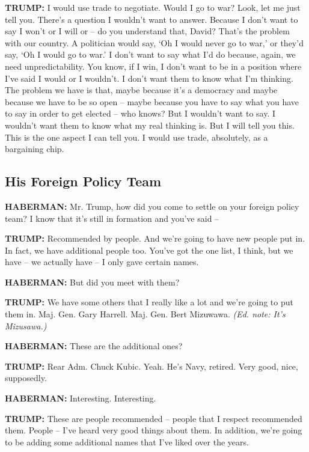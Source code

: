 \textbf{TRUMP:} I would use trade to negotiate. Would I go to war? Look,
let me just tell you. There's a question I wouldn't want to answer.
Because I don't want to say I won't or I will or -- do you understand
that, David? That's the problem with our country. A politician would
say, `Oh I would never go to war,' or they'd say, `Oh I would go to
war.' I don't want to say what I'd do because, again, we need
unpredictability. You know, if I win, I don't want to be in a position
where I've said I would or I wouldn't. I don't want them to know what
I'm thinking. The problem we have is that, maybe because it's a
democracy and maybe because we have to be so open -- maybe because you
have to say what you have to say in order to get elected -- who knows?
But I wouldn't want to say. I wouldn't want them to know what my real
thinking is. But I will tell you this. This is the one aspect I can tell
you. I would use trade, absolutely, as a bargaining chip.

\hypertarget{his-foreign-policy-team}{%
\subsection{His Foreign Policy Team}\label{his-foreign-policy-team}}

\textbf{HABERMAN:} Mr. Trump, how did you come to settle on your foreign
policy team? I know that it's still in formation and you've said --

\textbf{TRUMP:} Recommended by people. And we're going to have new
people put in. In fact, we have additional people too. You've got the
one list, I think, but we have -- we actually have -- I only gave
certain names.

\textbf{HABERMAN:} But did you meet with them?

\textbf{TRUMP:} We have some others that I really like a lot and we're
going to put them in. Maj. Gen. Gary Harrell. Maj. Gen. Bert Mizuwawa.
\emph{(Ed. note: It's Mizusawa.)}

\textbf{HABERMAN:} These are the additional ones?

\textbf{TRUMP:} Rear Adm. Chuck Kubic. Yeah. He's Navy, retired. Very
good, nice, supposedly.

\textbf{HABERMAN:} Interesting. Interesting.

\textbf{TRUMP:} These are people recommended -- people that I respect
recommended them. People -- I've heard very good things about them. In
addition, we're going to be adding some additional names that I've liked
over the years.

